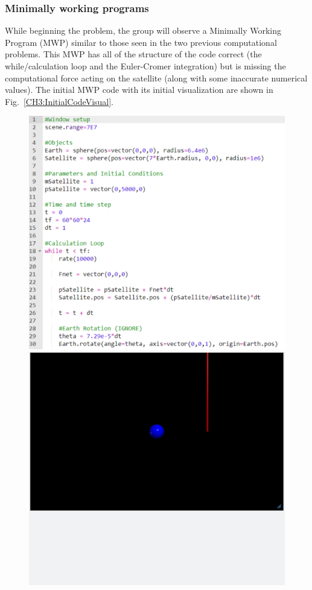 \documentclass{msuphddissertation}
\begin{document}
\begin{doublespace}
\subsubsection{Minimally working programs}\label{CH3:MWPs}

While beginning the problem, the group will observe a Minimally Working Program (MWP) similar to those seen in the two previous computational problems.  This MWP has all of the structure of the code correct (the while/calculation loop and the Euler-Cromer integration) but is missing the computational force acting on the satellite (along with some inaccurate numerical values).  The initial MWP code with its initial visualization are shown in Fig.~\ref{CH3:InitialCodeVisual}.

\begin{figure}[ht]\centering
\includegraphics[scale=0.40]{images/CH3InitialCode.pdf}\includegraphics[scale=0.40]{images/CH3InitialVisual.pdf}

\end{figure}
\end{doublespace}
\end{document}
